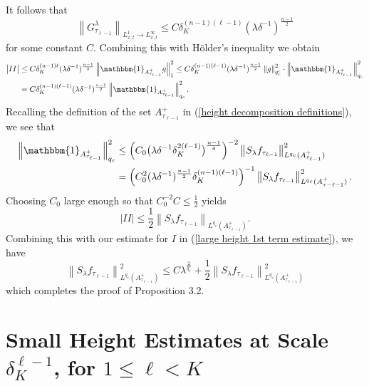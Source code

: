 \documentclass[11pt]{amsart}
\numberwithin{equation}{section}
\newcommand{\la}{\lambda}
\newcommand\norm[1]{\left\lVert#1\right\rVert}
\newcommand{\lpnorm}[3]{\norm{#1}_{L^{#2}(#3)}}
\newcommand{\Lpopnormalt}[5]{\norm{#1}_{L^{#2}_{#3} \to L^{#4}_{#5} }}
\newcommand{\lpn}[2]{\norm{#1}_{#2}}
\newcommand{\Sl}{S_{\la}}
\newcommand{\dK}[1]{\delta_{K}^{#1}}
\begin{document}
It follows that 
\begin{equation}
    \Lpopnormalt{G_{\tau_{\ell - 1}}^{\la}}{1}{x,t}{\infty}{x,t} \leq C\delta_{K}^{(n-1)(\ell - 1)}(\la \delta^{-1})^{\frac{n-1}{2}}
\end{equation}
for some constant $C$. Combining this with H\"{o}lder's inequality we obtain
\begin{equation}
\begin{split}
    \big| II \big| &\leq C\delta_{K}^{(n-1)\ell}(\la \delta^{-1})^{\frac{n-1}{2}} \lpn{\mathbbm{1}_{A^{+}_{\tau_{\ell - 1}}}g}{1}^2 \leq C\delta_{K}^{(n-1)(\ell-1)}(\la \delta^{-1})^{\frac{n-1}{2}}\lpn{g}{q_c'}^{2}\cdot \lpn{\mathbbm{1}_{A^{+}_{\tau_{\ell - 1}}}}{q_c}^2 \\
    &= C\delta_{K}^{(n-1)(\ell-1)}(\la \delta^{-1})^{\frac{n-1}{2}}\lpn{\mathbbm{1}_{A^{+}_{\tau_{\ell - 1}}}}{q_c}^2.
\end{split}
\end{equation}
Recalling the definition of the set $A^{+}_{\tau_{\ell - 1}}$ in (\ref{height decomposition definitions}), we see that
\begin{equation}
\begin{split}
    \lpn{\mathbbm{1}_{A^{+}_{\tau_{\ell - 1}}}}{q_c}^2 &\leq \Big(C_0\big(\la \delta^{-1}\delta_{K}^{2(\ell - 1)}\big)^{\frac{n-1}{4}}\Big)^{-2} \lpnorm{\Sl f_{\tau_{\ell - 1}}}{q_c}{A^{+}_{\tau_{\ell - 1}}}^2 \\
    &= \Big(C_0^2 (\la \delta^{-1})^{\frac{n-1}{2}}\delta_{K}^{(n-1)(\ell - 1)}\Big)^{-1}\lpnorm{\Sl f_{\tau_{\ell - 1}}}{q_c}{A^{+}_{\tau-{\ell - 1}}}^2.
\end{split}
\end{equation}
Choosing $C_0$ large enough so that $C_0^{-2}C \leq \frac{1}{2}$ yields 
\begin{equation}
    \big| II \big| \leq \frac{1}{2}\lpnorm{\Sl f_{\tau_{\ell - 1}}}{q_c}{A^{+}_{\tau_{\ell - 1}}}.
\end{equation}
Combining this with our estimate for $I$ in (\ref{large height 1st term estimate}), we have
\begin{equation}
    \lpnorm{\Sl f_{\tau_{\ell - 1}}}{q_c}{A^{+}_{\tau_{\ell - 1}}}^2 \leq C \la^{\frac{2}{q_c}} + \frac{1}{2}\lpnorm{\Sl f_{\tau_{\ell  -1}}}{q_c}{A^{+}_{\tau_{\ell - 1}}}^2
\end{equation}
 which completes the proof of Proposition 3.2.


 \section{Small Height Estimates at Scale $\dK{\ell-1}$, for $1 \leq \ell < K$}
\end{document}

